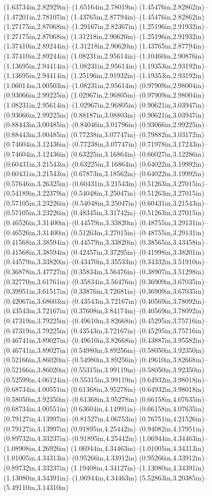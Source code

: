 (1.63734in,2.82929in)--(1.65164in,2.78019in) (1.45476in,2.82862in)--(1.47201in,2.78107in) (1.43765in,2.87794in)--(1.45476in,2.82862in) (1.27175in,2.87068in)--(1.29167in,2.82367in) (1.25196in,2.91932in)--(1.27175in,2.87068in) (1.31218in,2.90620in)--(1.25196in,2.91932in) (1.37410in,2.89244in)--(1.31218in,2.90620in) (1.43765in,2.87794in)--(1.37410in,2.89244in) (1.08231in,2.95614in)--(1.10460in,2.90876in) (1.13695in,2.94414in)--(1.08231in,2.95614in) (1.19353in,2.93192in)--(1.13695in,2.94414in) (1.25196in,2.91932in)--(1.19353in,2.93192in) (1.06014in,3.00503in)--(1.08231in,2.95614in) (0.97909in,2.98004in)--(0.93066in,2.99225in) (1.02967in,2.96805in)--(0.97909in,2.98004in) (1.08231in,2.95614in)--(1.02967in,2.96805in) (0.90621in,3.03947in)--(0.93066in,2.99225in) (0.88187in,3.08803in)--(0.90621in,3.03947in) (0.88443in,3.00485in)--(0.84046in,3.01796in) (0.93066in,2.99225in)--(0.88443in,3.00485in) (0.77238in,3.07747in)--(0.79882in,3.03172in) (0.74604in,3.12436in)--(0.77238in,3.07747in) (0.71978in,3.17243in)--(0.74604in,3.12436in) (0.63225in,3.16864in)--(0.66027in,3.12286in) (0.60431in,3.21543in)--(0.63225in,3.16864in) (0.64022in,3.19992in)--(0.60431in,3.21543in) (0.67873in,3.18562in)--(0.64022in,3.19992in) (0.57646in,3.26325in)--(0.60431in,3.21543in) (0.51263in,3.27015in)--(0.54189in,3.22379in) (0.54048in,3.25047in)--(0.51263in,3.27015in) (0.57105in,3.23226in)--(0.54048in,3.25047in) (0.60431in,3.21543in)--(0.57105in,3.23226in) (0.48345in,3.31742in)--(0.51263in,3.27015in) (0.46526in,3.31400in)--(0.44579in,3.33820in) (0.48755in,3.29131in)--(0.46526in,3.31400in) (0.51263in,3.27015in)--(0.48755in,3.29131in) (0.41568in,3.38594in)--(0.44579in,3.33820in) (0.38565in,3.43458in)--(0.41568in,3.38594in) (0.42457in,3.37295in)--(0.41998in,3.38201in) (0.44579in,3.33820in)--(0.43470in,3.35533in) (0.34332in,3.51910in)--(0.36878in,3.47727in) (0.35834in,3.56476in)--(0.38907in,3.51298in) (0.32770in,3.61761in)--(0.35834in,3.56476in) (0.36909in,3.67035in)--(0.39951in,3.61517in) (0.33876in,3.72681in)--(0.36909in,3.67035in) (0.42067in,3.68603in)--(0.43543in,3.72167in) (0.40569in,3.78092in)--(0.43543in,3.72167in) (0.37608in,3.84174in)--(0.40569in,3.78092in) (0.47319in,3.79225in)--(0.49610in,3.82668in) (0.45295in,3.75716in)--(0.47319in,3.79225in) (0.43543in,3.72167in)--(0.45295in,3.75716in) (0.46741in,3.89027in)--(0.49610in,3.82668in) (0.43887in,3.95582in)--(0.46741in,3.89027in) (0.54980in,3.89256in)--(0.58050in,3.92350in) (0.52166in,3.86020in)--(0.54980in,3.89256in) (0.49610in,3.82668in)--(0.52166in,3.86020in) (0.55315in,3.99119in)--(0.58050in,3.92350in) (0.52599in,4.06124in)--(0.55315in,3.99119in) (0.64932in,3.98018in)--(0.68734in,4.00551in) (0.61368in,3.95278in)--(0.64932in,3.98018in) (0.58050in,3.92350in)--(0.61368in,3.95278in) (0.66158in,4.07635in)--(0.68734in,4.00551in) (0.63604in,4.14991in)--(0.66158in,4.07635in) (0.79127in,4.13997in)--(0.81527in,4.06753in) (0.76751in,4.21526in)--(0.79127in,4.13997in) (0.91895in,4.25442in)--(0.94082in,4.17951in) (0.89732in,4.33237in)--(0.91895in,4.25442in) (1.06944in,4.34463in)--(1.08908in,4.26926in) (1.06944in,4.34463in)--(1.01005in,4.34313in) (1.01005in,4.34313in)--(0.95266in,4.33912in) (0.95266in,4.33912in)--(0.89732in,4.33237in) (1.19408in,4.34127in)--(1.13080in,4.34391in) (1.13080in,4.34391in)--(1.06944in,4.34463in) (5.52863in,3.20385in)--(5.49110in,3.14310in) 